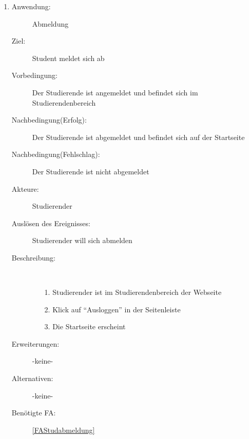 \documentclass[parskip=full]{scrartcl}
\newcommand{\swtLabel}[1]{\textbf{/#1\arabic*0/}}
\begin{document}
\begin{enumerate}[label=\swtLabel{S}]
  \item \label{UCstudLogout}
    \begin{description}
  	\item[Anwendung:] Abmeldung
  	\item[Ziel:] Student meldet sich ab
  	\item[Vorbedingung:] Der Studierende ist angemeldet und befindet sich im Studierendenbereich
  	\item[Nachbedingung(Erfolg):] Der Studierende ist abgemeldet und befindet sich auf der Startseite
  	\item[Nachbedingung(Fehlschlag):] Der Studierende ist nicht abgemeldet
  	\item[Akteure:] Studierender
  	\item[Auslösen des Ereignisses:] Studierender will sich abmelden
  	\item[Beschreibung:]~
  	\begin{enumerate}
  	  \item[1.] Studierender ist im Studierendenbereich der Webseite
      \item[2.] Klick auf \enquote{Ausloggen} in der Seitenleiste
      \item[3.] Die Startseite erscheint
  	\end{enumerate}
  	\item[Erweiterungen:] -keine-
  	\item[Alternativen:] -keine-
  	\item[Benötigte FA:] \ref{FAStudabmeldung}
  \end{description}
   
\end{enumerate}
\end{document}
